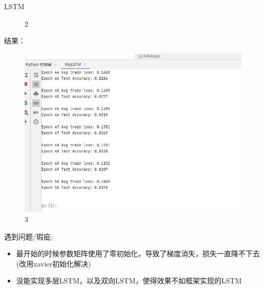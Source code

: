 \documentclass[UTF8]{ctexbeamer}
\begin{document}
\begin{frame}[allowframebreaks]{LSTM}
\begin{figure}[H]
	\caption{2}
\end{figure}
结果：
\begin{figure}[H] %
	\centering %
	\includegraphics[scale=0.35]{LSTM3.png} %
	\caption{3}
\end{figure}
遇到问题/瑕疵:
\begin{itemize}
	\item 最开始的时候参数矩阵使用了零初始化，导致了梯度消失，损失一直降不下去(改用xavier初始化解决)
	\item 没能实现多层LSTM，以及双向LSTM，使得效果不如框架实现的LSTM
\end{itemize}
\end{frame}
\end{document}
